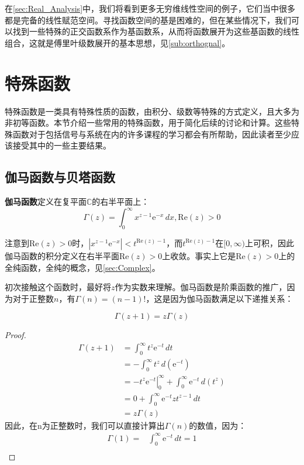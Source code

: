 \documentclass{ctexbook}
\newcommand{\evalat}[3]{\left.#1\right|_{#2}^{#3}}
\begin{document}
在\ref{sec:Real_Analysis}中，我们将看到更多无穷维线性空间的例子，它们当中很多都是完备的线性赋范空间。寻找函数空间的基是困难的，但在某些情况下，我们可以找到一些特殊的正交函数系作为基函数系，从而将函数展开为这些基函数的线性组合，这就是傅里叶级数展开的基本思想，见\ref{sub:orthognal}。

\section{特殊函数}\label{sec:special_function}

特殊函数是一类具有特殊性质的函数，由积分、级数等特殊的方式定义，且大多为非初等函数。本节介绍一些常用的特殊函数，用于简化后续的讨论和计算。这些特殊函数对于包括信号与系统在内的许多课程的学习都会有所帮助，因此读者至少应该接受其中的一些主要结果。

\subsection{伽马函数与贝塔函数}\label{sub:Gamma}

\begin{definition}
    \textbf{伽马函数}定义在复平面$\mathbb{C}$的右半平面上：
    \[\Gamma (z)=\int_{0}^{\infty}x^{z-1}\mathrm{e}^{-x}\,dx,\text{Re}(z)>0\]
\end{definition}
注意到$\text{Re}(z)>0$时，$|x^{z-1}\mathrm{e}^{-x}|<t^{\text{Re}(z)-1}$，而$t^{\text{Re}(z)-1}$在$[0,\infty)$上可积，因此伽马函数的积分定义在右半平面$\text{Re}(z)>0$上收敛。事实上它是$\text{Re}(z)>0$上的全纯函数，全纯的概念，见\ref{sec:Complex}。

初次接触这个函数时，最好将$z$作为实数来理解。伽马函数是阶乘函数的推广，因为对于正整数$n$，有$\Gamma (n)=(n-1)!$，这是因为伽马函数满足以下递推关系：
\begin{theorem}
    \[\Gamma (z+1)=z\Gamma (z)\]
\end{theorem}
\begin{proof}
    \begin{align*}
    \Gamma (z+1)&=\int_{0}^{\infty}t^{z}\mathrm{e}^{-t}\,dt\\
                &=-\int_{0}^{\infty}t^{z}\,d(\mathrm{e}^{-t})\\
                &=\evalat{-t^{z}\mathrm{e}^{-t}}{0}{\infty}+\int_{0}^{\infty}\mathrm{e}^{-t}\,d(t^{z})\\
                &=0+\int_{0}^{\infty}\mathrm{e}^{-t}zt^{z-1}\,dt\\
                &=z\Gamma (z)
    \end{align*}
    因此，在n为正整数时，我们可以直接计算出$\Gamma(n)$的数值，因为：
    \begin{align*}
        \Gamma(1)=&\int_{0}^{\infty}\mathrm{e}^{-t}\,dt=1\\
    \end{align*}
\end{proof}
\end{document}
